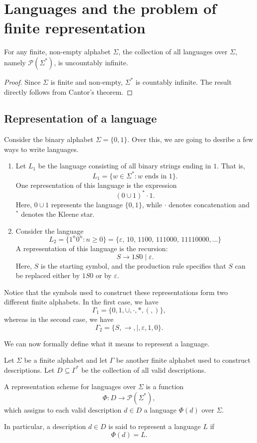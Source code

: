 \documentclass[10pt,a4paper]{article}
\begin{document}
\section{Languages and the problem of finite representation}
\begin{theorem}
For any finite, non-empty alphabet $\Sigma$, the collection of all languages over $\Sigma$, namely $\mathcal{P}(\Sigma^*)$, is uncountably infinite.
\end{theorem}

\begin{proof}
Since $\Sigma$ is finite and non-empty, $\Sigma^*$ is countably infinite. The result directly follows from Cantor's theorem.
\end{proof}
\subsection{Representation of a language}
    Consider the binary alphabet \(\Sigma=\{0,1\}.\) Over this, we are going to desribe a few ways to write languages.
\begin{enumerate}
    \item Let $L_1$ be the language consisting of all binary strings ending in $1$. That is,
    \[
        L_1=\{w\in\Sigma^*:w\text{ ends in }1\}.
    \]
    One representation of this language is the expression
    \[
        (0\cup 1)^*\cdot 1.
    \]
    Here, $0\cup 1$ represents the language $\{0,1\}$, while $\cdot$ denotes concatenation and $^*$ denotes the Kleene star.

    \item Consider the language
    \[
        L_2=\{1^n0^n:n\geq 0\} = \{\varepsilon,\, 10,\, 1100,\,
        111000,\, 11110000,\ldots\}
    \]
    A representation of this language is the recursion:
    \[
        S\longrightarrow 1S0\mid\varepsilon.
    \]
    Here, $S$ is the starting symbol, and the production rule specifies that $S$ can be replaced either by $1S0$ or by $\varepsilon$.
\end{enumerate}

Notice that the symbols used to construct these representations form two different finite alphabets. In the first case, we have
\[
    \Gamma_1=\{0,1,\cup,\cdot,*,(,)\},
\]
whereas in the second case, we have
\[
    \Gamma_2=\{S,\longrightarrow,\mid,\varepsilon,1,0\}.
\]

We can now formally define what it means to represent a language.

\begin{definition}
Let $\Sigma$ be a finite alphabet and let $\Gamma$ be another finite alphabet used to construct descriptions. Let $D\subseteq\Gamma^*$ be the collection of all valid descriptions.

A \textsf{representation scheme} for languages over $\Sigma$ is a function
\[
    \Phi:D\longrightarrow\mathcal{P}(\Sigma^*),
\]
which assigns to each valid description $d\in D$ a language $\Phi(d)$ over $\Sigma$.

In particular, a description $d\in D$ is said to represent a language $L$ if
\[
    \Phi(d)=L.
\]
\end{definition}
\end{document}
